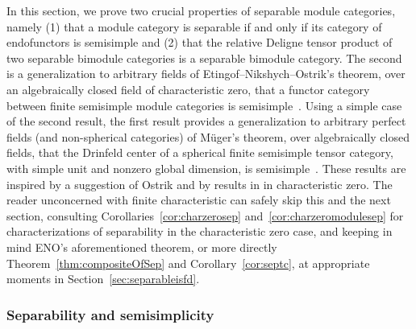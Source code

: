 \documentclass{amsart}
\begin{document}
In this section, we prove two crucial properties of separable module categories, namely (1) that a module category is separable if and only if its category of endofunctors is semisimple and (2) that the relative Deligne tensor product of two separable bimodule categories is a separable bimodule category.  The second is a generalization to arbitrary fields of Etingof--Nikshych--Ostrik's theorem, over an algebraically closed field of characteristic zero, that a functor category between finite semisimple module categories is semisimple~\cite[Theorem 2.16]{MR2183279}.  Using a simple case of the second result, the first result provides a generalization to arbitrary perfect fields (and non-spherical categories) of M\"uger's theorem, over algebraically closed fields, that the Drinfeld center of a spherical finite semisimple tensor category, with simple unit and nonzero global dimension, is semisimple~\cite[Theorem 3.16]{MR1966525}.    These results are inspired by a suggestion of Ostrik and by results in \cite[\S 2.4]{MR3039775} in characteristic zero.  The reader unconcerned with finite characteristic can safely skip this and the next section, consulting Corollaries~\ref{cor:charzerosep} and~\ref{cor:charzeromodulesep} for characterizations of separability in the characteristic zero case, and keeping in mind ENO's aforementioned theorem, or more directly Theorem~\ref{thm:compositeOfSep} and Corollary~\ref{cor:septc}, at appropriate moments in Section~\ref{sec:separableisfd}.

\subsubsection{Separability and semisimplicity} \label{sec:sepandsemi}
\end{document}
